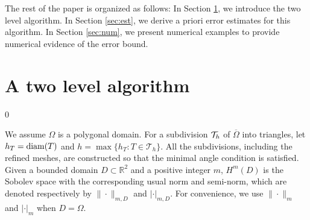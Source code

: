 \documentclass[12pt]{article}
\begin{document}
The rest of the paper is organized as follows: In Section \ref{sec:alg}, we introduce
the two level  algorithm. In Section \ref{sec:est}, we derive a priori error
estimates for this algorithm.  In Section \ref{sec:num}, we present numerical examples to 
provide numerical evidence of the error bound.  



\section{A two level algorithm}\label{sec:alg}
\setcounter{equation}0

We assume $\Omega$ is a polygonal domain.  For a subdivision ${\cal T}_h$ of
$\overline{\Omega}$ into triangles, let $h_T ={\rm diam}(T)$ and $h =
\max\{h_T: T\in \mathcal{T}_h\}$.  All the subdivisions, including the refined meshes,
are constructed so that the minimal angle condition is satisfied. Given a bounded domain $D\subset \mathbb{R}^2$ and a positive integer $m$, $H^m(D)$ is the Sobolev space with the corresponding usual norm and semi-norm, which are denoted respectively by $\|\cdot\|_{m,D}$ and $|\cdot|_{m,D}$. For convenience, we use $\|\cdot\|_{m}$ and $|\cdot|_{m}$ when $D=\Omega$.
\end{document}
